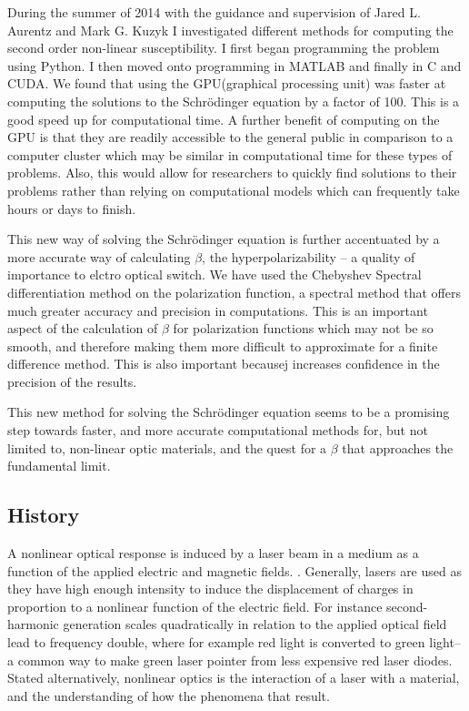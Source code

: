 \documentclass{report}
\theoremstyle{definition}
\begin{document}
During the summer of 2014 with the guidance and supervision of Jared L. Aurentz and Mark G. Kuzyk I investigated different methods for computing the second order non-linear susceptibility. I first began programming the problem using Python. I then moved onto programming in MATLAB and finally in C and CUDA. We found that using the GPU(graphical processing unit) was faster at computing the solutions to the Schrödinger equation by a factor of 100. This is a good speed up for computational time. A further benefit of computing on the GPU is that they are readily accessible to the general public in comparison to a computer cluster which may be similar in computational time for these types of problems. Also, this would allow for researchers to quickly find solutions to their problems rather than relying on computational models which can frequently take hours or days to finish. 

This new way of solving the Schr\"odinger equation is further accentuated by a more accurate way of calculating $\beta$, the hyperpolarizability -- a quality of importance to elctro optical switch. We have used the Chebyshev Spectral differentiation method on the polarization function, a spectral method that offers much greater accuracy and precision in computations. This is an important aspect of the calculation of $\beta$ for polarization functions which may not be so smooth, and therefore making them more difficult to approximate for a finite difference method. This is also important becausej increases confidence in the precision of the results. 

This new method for solving the Schr\"odinger equation seems to be a promising step towards faster, and more accurate computational methods for, but not limited to, non-linear optic materials, and the quest for a $\beta$ that approaches the fundamental limit. \cite{kuzyk2000physical}


\subsection*{History}

A nonlinear optical response is induced by a laser beam in a medium as a function of the applied electric and magnetic fields. \cite{bloembergen}. Generally, lasers are used as they have high enough intensity to induce the displacement of charges in proportion to a nonlinear function of the electric field. For instance second-harmonic generation scales quadratically in relation to the applied optical field lead to frequency double, where for example red light is converted to green light--a common way to make green laser pointer from less expensive red laser diodes. Stated alternatively, nonlinear optics is the interaction of a laser with a material, and the understanding of how the phenomena that result.
\end{document}

